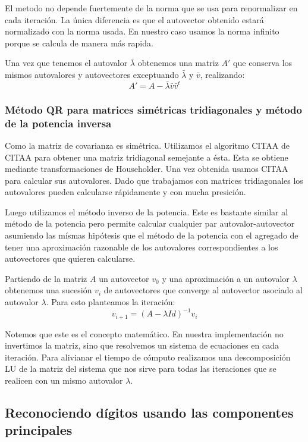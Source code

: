 	El metodo no depende fuertemente de la norma que se usa para renormalizar
	en cada iteraci\'on. La \'unica diferencia es que el autovector obtenido
	estar\'a normalizado con la norma usada. En nuestro caso usamos la norma
	infinito porque se calcula de manera m\'as rapida.

	Una vez que tenemos el autovalor $\bar{\lambda}$ obtenemos una matriz
	$A'$ que conserva los mismos autovalores y autovectores exceptuando
	$\bar{\lambda}$ y $\bar{v}$, realizando:
	$$A' = A-\bar{\lambda}\bar{v}\bar{v}^t$$

\subsubsection{M\'etodo QR para matrices sim\'etricas tridiagonales y m\'etodo
de la potencia inversa}

	Como la matriz de covarianza es sim\'etrica. Utilizamos el algoritmo
	CITAA de CITAA para obtener una matriz tridiagonal semejante a \'esta.
	Esta se obtiene mediante transformaciones de Householder.
	Una vez obtenida usamos CITAA para calcular sus autovalores.
	Dado que trabajamos con matrices tridiagonales los autovalores pueden
	calcularse r\'apidamente y con mucha presici\'on.

	Luego utilizamos el m\'etodo inverso de la potencia.
	Este es bastante similar al m\'etodo de la potencia pero permite calcular
	cualquier par autovalor-autovector asumiendo las m\'ismas hip\'otesis
	que el m\'etodo de la potencia con el agregado de tener una aproximaci\'on
	razonable de los autovalores correspondientes a los autovectores que
	quieren calcularse.

	Partiendo de la matriz $A$ un autovector $v_0$ y una aproximaci\'on a un
	autovalor $\lambda$ obtenemos una sucesi\'on ${v_i}$ de autovectores
	que converge al autovector asociado al autovalor $\lambda$.
	Para esto planteamos la iteraci\'on:
	$$v_{i+1} = (A-\lambda Id)^{-1}v_i$$

	Notemos que este es el concepto matem\'atico. En nuestra implementaci\'on
	no invertimos la matriz, sino que resolvemos un sistema de ecuaciones
	en cada iteraci\'on. Para alivianar el tiempo de c\'omputo realizamos
	una descomposici\'on LU de la matriz del sistema que nos sirve para
	todas las iteraciones que se realicen con un mismo autovalor $\lambda$.

\subsection{Reconociendo d\'igitos usando las componentes principales}

